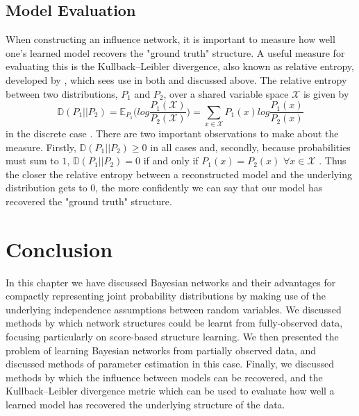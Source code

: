 \documentclass [11pt]{article}
\begin{document}
\subsection{Model Evaluation}\label{ModelEvaluation}
When constructing an influence network, it is important to measure how well one's learned model recovers the "ground truth" structure. A useful measure for evaluating this is the Kullback–Leibler divergence, also known as relative entropy, developed by \cite{kullback1951}, which sees use in both \cite{ajoodha17} and \cite{ajoodha18} discussed above. The relative entropy between two distributions, $P_{1}$ and $P_{2}$, over a shared variable space $\mathcal{X}$ is given by
\begin{equation*}
\mathbb{D}(P_{1}||P_{2}) = \mathbb{E}_{P_{1}}\Bigg(log\frac{P_{1}(\mathcal{X})}{P_{2}(\mathcal{X})}\Bigg) = \sum_{x\in\mathcal{X}}P_{1}(x)log\frac{P_{1}(x)}{P_{2}(x)}
\end{equation*}
in the discrete case \citep{koller09}. There are two important observations to make about the measure. Firstly, $\mathbb{D}(P_{1}||P_{2}) \geq 0$ in all cases and, secondly, because probabilities must sum to $1$, $\mathbb{D}(P_{1}||P_{2}) = 0$ if and only if $P_{1}(x) = P_{2}(x)$ $\forall x\in\mathcal{X}$ \citep{koller09}. Thus the closer the relative entropy between a reconstructed model and the underlying distribution gets to $0$, the more confidently we can say that our model has recovered the "ground truth" structure.
\section{Conclusion}
In this chapter we have discussed Bayesian networks and their advantages for compactly representing joint probability distributions by making use of the underlying independence assumptions between random variables. We discussed methods by which network structures could be learnt from fully-observed data, focusing particularly on score-based structure learning. We then presented the problem of learning Bayesian networks from partially observed data, and discussed methods of parameter estimation in this case. Finally, we discussed methods by which the influence between models can be recovered, and the Kullback–Leibler divergence metric which can be used to evaluate how well a learned model has recovered the underlying structure of the data.


\end{document}
